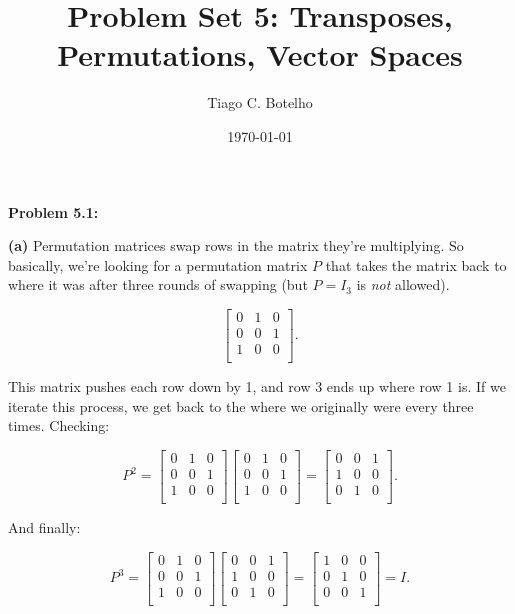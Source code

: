 \documentclass{article}
\title{Problem Set 5: Transposes, Permutations, Vector Spaces}
\author{Tiago C. Botelho}
\date{\today}
\begin{document}
\maketitle

\noindent \textbf{Problem 5.1:}

\noindent \textbf{(a)} Permutation matrices swap rows in the matrix they're multiplying. So basically, we're looking for a permutation matrix $P$ that takes the matrix back to where it was after three rounds of swapping (but $P = I_3$ is \textit{not} allowed).

\[
\begin{bmatrix}
0 & 1 & 0\\
0 & 0 & 1\\
1 & 0 & 0\\
\end{bmatrix}.
\]

This matrix pushes each row down by 1, and row 3 ends up where row 1 is. If we iterate this process, we get back to the where we originally were every three times. Checking:

\[
P^{2} = \begin{bmatrix}
0 & 1 & 0\\
0 & 0 & 1\\
1 & 0 & 0\\
\end{bmatrix}
\begin{bmatrix}
0 & 1 & 0\\
0 & 0 & 1\\
1 & 0 & 0\\
\end{bmatrix}
=
\begin{bmatrix}
0 & 0 & 1\\
1 & 0 & 0\\
0 & 1 & 0\\
\end{bmatrix}.
\]

And finally:

\[
P^{3} = \begin{bmatrix}
0 & 1 & 0\\
0 & 0 & 1\\
1 & 0 & 0\\
\end{bmatrix}
\begin{bmatrix}
0 & 0 & 1\\
1 & 0 & 0\\
0 & 1 & 0\\
\end{bmatrix}
=
\begin{bmatrix}
1 & 0 & 0\\
0 & 1 & 0\\
0 & 0 & 1\\
\end{bmatrix} = I.
\]
\end{document}

